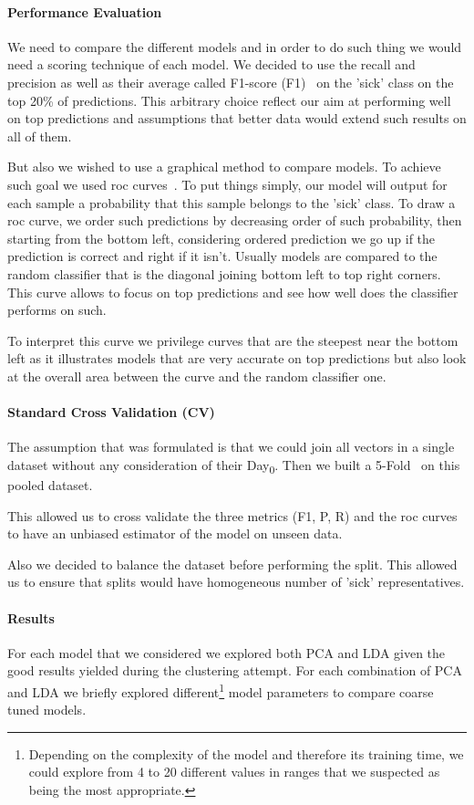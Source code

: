 \paragraph{Performance Evaluation}
We need to compare the different models and in order to do such thing we would need a scoring technique of each model. We decided to use the recall and precision  as well as their average called F1-score (F1)~\cite{wiki:f1} on the 'sick' class on the top 20\% of predictions. This arbitrary choice reflect our aim at performing well on top predictions and assumptions that better data would extend such results on all of them.  

But also we wished to use a graphical method to compare models. To achieve such goal we used \acrfull{roc} curves~\cite{wiki:roc}. To put things simply, our model will output for each sample a probability that this sample belongs to the 'sick' class. To draw a \acrshort{roc} curve, we order such predictions by decreasing order of such probability, then starting from the bottom left, considering ordered prediction we go up if the prediction is correct and right if it isn't. Usually models are compared to the random classifier that is the diagonal joining bottom left to top right corners. This curve allows to focus on top predictions and see how well does the classifier performs on such.

To interpret this curve we privilege curves that are the steepest near the bottom left as it illustrates models that are very accurate on top predictions but also look at the overall area between the curve and the random classifier one. 

\paragraph{Standard Cross Validation (CV)}
The assumption that was formulated is that we could join all vectors in a single dataset without any consideration of their Day\textsubscript{0}. Then we built a 5-Fold~\cite{wiki:cv} on this pooled dataset.  

This allowed us to cross validate the three metrics (F1, P, R) and the \acrshort{roc} curves to have an unbiased estimator of the model on unseen data. 

Also we decided to balance the dataset before performing the split. This allowed us to ensure that splits would have homogeneous number of 'sick' representatives. 

\paragraph{Results}
For each model that we considered we explored both PCA and LDA given the good results yielded during the clustering attempt. For each combination of PCA and LDA we briefly explored different\footnote{Depending on the complexity of the model and therefore its training time, we could explore from 4 to 20 different values in ranges that we suspected as being the most appropriate.} model parameters to compare coarse tuned models. 

